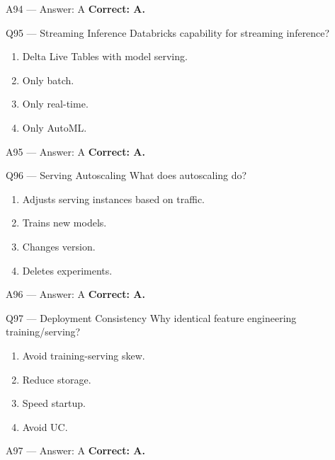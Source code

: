 \documentclass[aspectratio=169,9pt]{beamer}
\begin{document}
	\begin{frame}{A94 — Answer: A}
		\textbf{Correct: A.}
	\end{frame}
	
	\begin{frame}{Q95 — Streaming Inference}
		Databricks capability for streaming inference?
		\begin{enumerate}[label=\Alph*.]
			\item Delta Live Tables with model serving.
			\item Only batch.
			\item Only real-time.
			\item Only AutoML.
		\end{enumerate}
	\end{frame}
	
	\begin{frame}{A95 — Answer: A}
		\textbf{Correct: A.}
	\end{frame}
	
	\begin{frame}{Q96 — Serving Autoscaling}
		What does autoscaling do?
		\begin{enumerate}[label=\Alph*.]
			\item Adjusts serving instances based on traffic.
			\item Trains new models.
			\item Changes version.
			\item Deletes experiments.
		\end{enumerate}
	\end{frame}
	
	\begin{frame}{A96 — Answer: A}
		\textbf{Correct: A.}
	\end{frame}
	
	\begin{frame}{Q97 — Deployment Consistency}
		Why identical feature engineering training/serving?
		\begin{enumerate}[label=\Alph*.]
			\item Avoid training-serving skew.
			\item Reduce storage.
			\item Speed startup.
			\item Avoid UC.
		\end{enumerate}
	\end{frame}
	
	\begin{frame}{A97 — Answer: A}
		\textbf{Correct: A.}
	\end{frame}
	
\end{document}
